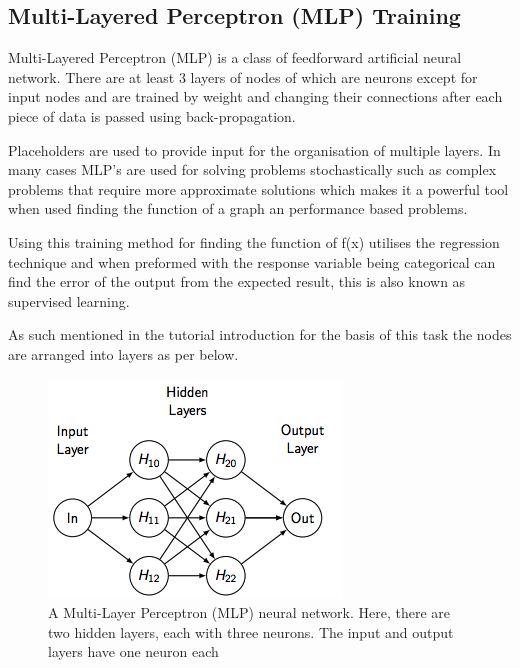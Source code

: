 \documentclass[a4paper, 10pt]{IEEEconf}
\begin{document}

\subsection{Multi-Layered Perceptron (MLP) Training}

Multi-Layered Perceptron (MLP) is a class of feedforward artificial neural network. There are at least 3 layers of nodes of which are neurons except for input nodes and are trained by weight and changing their connections after each piece of data is passed using back-propagation. \cite{MLP2}

Placeholders are used to provide input for the organisation of multiple layers. In many cases MLP's are used for solving problems stochastically such as complex problems that require more approximate solutions which makes it a powerful tool when used finding the function of a graph an performance based problems.

Using this training method for finding the function of f(x) utilises the regression technique and when preformed with the response variable being categorical can find the error of the output from the expected result, this is also known as supervised learning.

As such mentioned in the tutorial introduction for the basis of this task the nodes are arranged into layers as per below.

\begin{figure}[H]
  \includegraphics[width=0.5\linewidth, center]{images/mlp}
  \caption{A Multi-Layer Perceptron (MLP) neural network. Here, there are two
hidden layers, each with three neurons. The input and output layers have one
neuron each}
  \label{fig:A Multi-Layer Perceptron (MLP) neural network. Here, there are two
hidden layers, each with three neurons. The input and output layers have one
neuron each}
\end{figure}

\end{document}
